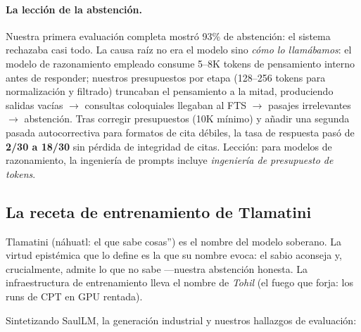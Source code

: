 \paragraph{La lección de la abstención.} Nuestra primera evaluación completa mostró 93\% de abstención: el sistema rechazaba casi todo. La causa raíz no era el modelo sino \emph{cómo lo llamábamos}: el modelo de razonamiento empleado consume 5--8K tokens de pensamiento interno antes de responder; nuestros presupuestos por etapa (128--256 tokens para normalización y filtrado) truncaban el pensamiento a la mitad, produciendo salidas vacías $\rightarrow$ consultas coloquiales llegaban al FTS $\rightarrow$ pasajes irrelevantes $\rightarrow$ abstención. Tras corregir presupuestos (10K mínimo) y añadir una segunda pasada autocorrectiva para formatos de cita débiles, la tasa de respuesta pasó de \textbf{2/30 a 18/30} sin pérdida de integridad de citas. Lección: para modelos de razonamiento, la ingeniería de prompts incluye \emph{ingeniería de presupuesto de tokens}.

\subsection{La receta de entrenamiento de Tlamatini}

Tlamatini (náhuatl: el que sabe cosas'') es el nombre del modelo soberano. La virtud epistémica que lo define es la que su nombre evoca: el sabio aconseja y, crucialmente, admite lo que no sabe ---nuestra abstención honesta. La infraestructura de entrenamiento lleva el nombre de \emph{Tohil} (el fuego que forja: los runs de CPT en GPU rentada).

Sintetizando SaulLM, la generación industrial y nuestros hallazgos de evaluación:


